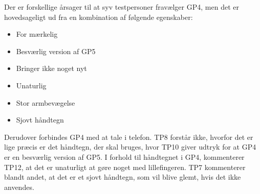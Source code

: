 \noindent
%
Der er forskellige årsager til at syv testpersoner fravælger GP4, men det er hovedsageligt ud fra en kombination af følgende egenskaber:
%
\begin{multicols}{3}
    \begin{itemize}
        \item For mærkelig
        \item Besværlig version af GP5
        \item Bringer ikke noget nyt
        \item Unaturlig
        \item Stor armbevægelse
        \item Sjovt håndtegn
\end{itemize}
\end{multicols}
\noindent
%
Derudover forbindes GP4 med at tale i telefon. TP8 forstår ikke, hvorfor det er lige præcis er det håndtegn, der skal bruges, hvor TP10 giver udtryk for at GP4 er en besværlig version af GP5. I forhold til håndtegnet i GP4, kommenterer TP12, at det er unaturligt at gøre noget med lillefingeren. TP7 kommenterer blandt andet, at det er et sjovt håndtegn, som vil blive glemt, hvis det ikke anvendes. 

